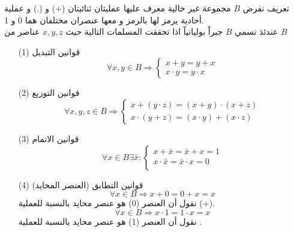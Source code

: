 \begin{frame}
	\begin{exampleblock}{تعريف}
		نفرض $B$ مجموعة غير خالية معرف عليها عمليتان ثنائيتان (+) و (.) و عملية أحادية يرمز لها بالرمز 
		\en{( $\bar{}$ )} و معها عنصران مختلفان هما 0 و 1.\\
		عندئذ نسمي $B$ جبراً بوليانياً اذا تحققت المسلمات التالية حيث $x,y,z$ عناصر من $B$
\begin{enumerate}
	\item[(1)] قوانين التبديل
	\[
	\forall x, y \in B \Rightarrow \begin{cases}
		x + y = y + x\\
		x\cdot y = y \cdot x
	\end{cases}
	\]
	\item[(2)] قوانين التوزيع
	\[
	\forall x,y,z \in B \Rightarrow \begin{cases}
		x + (y\cdot z) = (x+y)\cdot(x+z) \\
		x \cdot(y+z) = (x\cdot y) + (x\cdot z)
	\end{cases}
	\]
		\end{enumerate}
	\end{exampleblock}
\end{frame}
\begin{frame}

\begin{exampleblock}{}
		\begin{enumerate}
	\item[(3)] قوانين الاتمام 
	\[
	\forall x \in B \exists \bar{x}: \begin{cases}
		x + \bar{x} = \bar{x} + x = 1\\
		x \cdot\bar{x} = \bar{x} \cdot x = 0\\
	\end{cases}
	\]
		\item[(4)] قوانين التطابق (العنصر المحايد)
	\[
	\forall x \in B \Rightarrow x + 0 = 0 + x = x
	\]
	نقول أن العنصر (0) هو عنصر محايد بالنسبة للعملية (+).
	\[
	\forall x \in B \Rightarrow x \cdot 1= 1\cdot  x = x
	\]
		نقول أن العنصر (1) هو عنصر محايد بالنسبة للعملية \en{($\cdot$)}.
\end{enumerate}
\end{exampleblock}
\end{frame}

